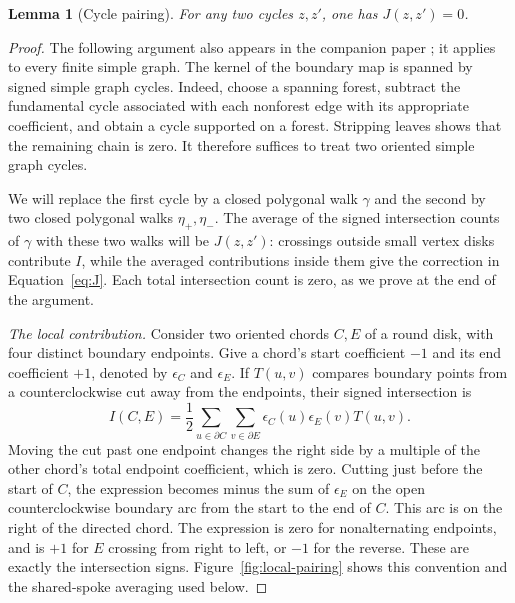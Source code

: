 \documentclass[11pt,a4paper]{article}
\newtheorem{lemma}[theorem]{Lemma}
\theoremstyle{remark}
\numberwithin{equation}{section}
\begin{document}
\begin{lemma}[Cycle pairing]\label{lem:cycles}
For any two cycles \(z,z'\), one has \(J(z,z')=0\).
\end{lemma}

\begin{proof}
The following argument also appears in the companion paper
\cite[Lemma~3.1]{BipartiteCompanion}; it applies to every finite simple graph.
The kernel of the boundary map is spanned by signed simple graph
cycles. Indeed, choose a spanning forest, subtract the fundamental
cycle associated with each nonforest edge with its appropriate
coefficient, and obtain a cycle supported on a forest. Stripping
leaves shows that the remaining chain is zero. It therefore suffices
to treat two oriented simple graph cycles.

We will replace the first cycle by a closed polygonal walk \(\gamma\)
and the second by two closed polygonal walks \(\eta_+,\eta_-\).
The average of the signed intersection counts of \(\gamma\) with
these two walks will be \(J(z,z')\): crossings outside small vertex
disks contribute \(I\), while the averaged contributions inside them
give the correction in Equation~\eqref{eq:J}. Each total intersection
count is zero, as we prove at the end of the argument.

\emph{The local contribution.} Consider two oriented chords \(C,E\) of a round disk, with
four distinct boundary endpoints. Give a chord's start coefficient
\(-1\) and its end coefficient \(+1\), denoted by \(\epsilon_C\)
and \(\epsilon_E\). If \(T(u,v)\) compares boundary points from a
counterclockwise cut away from the endpoints, their signed intersection is
\begin{equation}\label{eq:chord}
I(C,E)=\frac12
\sum_{u\in\partial C}\sum_{v\in\partial E}
\epsilon_C(u)\epsilon_E(v)T(u,v).
\end{equation}
Moving the cut past one endpoint changes the right side by a multiple
of the other chord's total endpoint coefficient, which is zero.
Cutting just before the start of \(C\), the expression becomes minus
the sum of \(\epsilon_E\) on the open counterclockwise boundary arc
from the start to the end of \(C\). This arc is on the right of the
directed chord. The expression is zero for nonalternating endpoints,
and is \(+1\) for \(E\) crossing from right to left, or \(-1\) for
the reverse. These are exactly the intersection signs. Figure~\ref{fig:local-pairing}
shows this convention and the shared-spoke averaging used below.




\end{proof}
\end{document}
